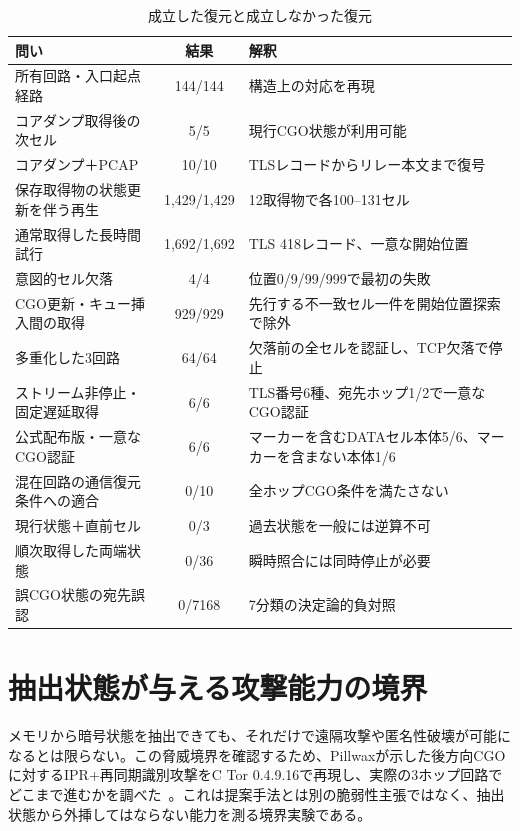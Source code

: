 \documentclass[10pt,a4paper]{ltjsarticle}
\begin{document}
\begin{table}[!tbp]
\centering
\caption{成立した復元と成立しなかった復元}
\label{tab:boundary}
\small
\begin{tabularx}{\linewidth}{YcY}
\toprule
問い & 結果 & 解釈 \\
\midrule
所有回路・入口起点経路 & 144/144 & 構造上の対応を再現 \\
コアダンプ取得後の次セル & 5/5 & 現行CGO状態が利用可能 \\
コアダンプ＋PCAP & 10/10 & TLSレコードからリレー本文まで復号 \\
保存取得物の状態更新を伴う再生 & 1,429/1,429 & 12取得物で各100--131セル \\
通常取得した長時間試行 & 1,692/1,692 & TLS 418レコード、一意な開始位置 \\
意図的セル欠落 & 4/4 & 位置0/9/99/999で最初の失敗 \\
CGO更新・キュー挿入間の取得 & 929/929 & 先行する不一致セル一件を開始位置探索で除外 \\
多重化した3回路 & 64/64 & 欠落前の全セルを認証し、TCP欠落で停止 \\
ストリーム非停止・固定遅延取得 & 6/6 & TLS番号6種、宛先ホップ1/2で一意なCGO認証 \\
公式配布版・一意なCGO認証 & 6/6 & マーカーを含むDATAセル本体5/6、マーカーを含まない本体1/6 \\
混在回路の通信復元条件への適合 & 0/10 & 全ホップCGO条件を満たさない \\
現行状態＋直前セル & 0/3 & 過去状態を一般には逆算不可 \\
順次取得した両端状態 & 0/36 & 瞬時照合には同時停止が必要 \\
誤CGO状態の宛先誤認 & 0/7168 & 7分類の決定論的負対照 \\
\bottomrule
\end{tabularx}
\end{table}

\section{抽出状態が与える攻撃能力の境界}\label{sec:security}

メモリから暗号状態を抽出できても、それだけで遠隔攻撃や匿名性破壊が可能になるとは限らない。この脅威境界を確認するため、Pillwaxが示した後方向CGOに対するIPR+再同期識別攻撃をC Tor 0.4.9.16で再現し、実際の3ホップ回路でどこまで進むかを調べた~\cite{pillwax2026improving}。これは提案手法とは別の脆弱性主張ではなく、抽出状態から外挿してはならない能力を測る境界実験である。
\end{document}
